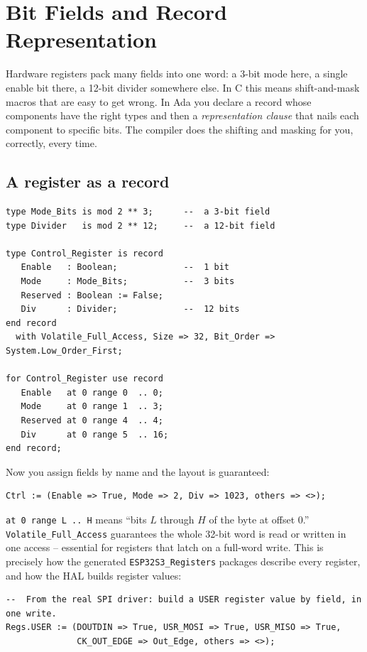 \section{Bit Fields and Record Representation}
\label{ch:bitfields}

Hardware registers pack many fields into one word: a 3-bit mode here, a single
enable bit there, a 12-bit divider somewhere else. In C this means shift-and-mask
macros that are easy to get wrong. In Ada you declare a record whose components
have the right types and then a \emph{representation clause} that nails each
component to specific bits. The compiler does the shifting and masking for you,
correctly, every time.

\subsection{A register as a record}

\begin{lstlisting}
type Mode_Bits is mod 2 ** 3;      --  a 3-bit field
type Divider   is mod 2 ** 12;     --  a 12-bit field

type Control_Register is record
   Enable   : Boolean;             --  1 bit
   Mode     : Mode_Bits;           --  3 bits
   Reserved : Boolean := False;
   Div      : Divider;             --  12 bits
end record
  with Volatile_Full_Access, Size => 32, Bit_Order => System.Low_Order_First;

for Control_Register use record
   Enable   at 0 range 0  .. 0;
   Mode     at 0 range 1  .. 3;
   Reserved at 0 range 4  .. 4;
   Div      at 0 range 5  .. 16;
end record;
\end{lstlisting}

Now you assign fields by name and the layout is guaranteed:

\begin{lstlisting}
Ctrl := (Enable => True, Mode => 2, Div => 1023, others => <>);
\end{lstlisting}

\texttt{at 0 range L\,..\,H} means ``bits $L$ through $H$ of the byte at offset
0.'' \texttt{Volatile\_Full\_Access} guarantees the whole 32-bit word is read or
written in one access -- essential for registers that latch on a full-word
write. This is precisely how the generated \texttt{ESP32S3\_Registers} packages
describe every register, and how the HAL builds register values:

\begin{lstlisting}
--  From the real SPI driver: build a USER register value by field, in one write.
Regs.USER := (DOUTDIN => True, USR_MOSI => True, USR_MISO => True,
              CK_OUT_EDGE => Out_Edge, others => <>);
\end{lstlisting}

